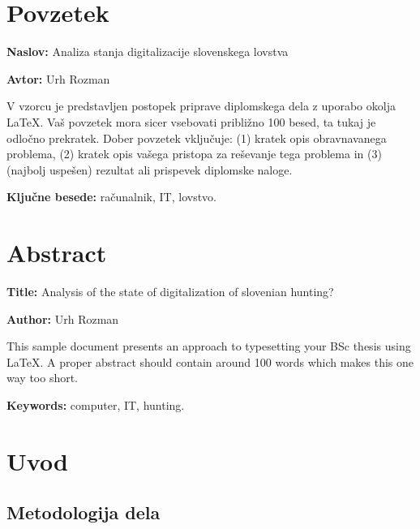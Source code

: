 \documentclass[a4paper,12pt,openright]{book}
\newcommand{\ttitle}{Analiza stanja digitalizacije slovenskega lovstva}
\newcommand{\ttitleEn}{Analysis of the state of digitalization of slovenian hunting?}
\newcommand{\tauthor}{Urh Rozman}
\newcommand{\tkeywords}{računalnik, IT, lovstvo}
\newcommand{\tkeywordsEn}{computer, IT, hunting}
\newcommand{\clearemptydoublepage}{\newpage{\pagestyle{empty}\cleardoublepage}}
\begin{document}
\clearemptydoublepage

\chapter*{Povzetek}

\noindent\textbf{Naslov:} \ttitle
\bigskip

\noindent\textbf{Avtor:} \tauthor
\bigskip

\noindent V vzorcu je predstavljen postopek priprave diplomskega dela z uporabo okolja \LaTeX. Vaš povzetek mora sicer vsebovati približno 100 besed, ta tukaj je odločno prekratek.
Dober povzetek vključuje: (1) kratek opis obravnavanega problema, (2) kratek opis vašega pristopa za reševanje tega problema in (3) (najbolj uspešen) rezultat ali prispevek diplomske naloge.

\bigskip

\noindent\textbf{Ključne besede:} \tkeywords.
\clearemptydoublepage

\chapter*{Abstract}

\noindent\textbf{Title:} \ttitleEn
\bigskip

\noindent\textbf{Author:} \tauthor
\bigskip

\noindent This sample document presents an approach to typesetting your BSc thesis using \LaTeX. 
A proper abstract should contain around 100 words which makes this one way too short.
\bigskip

\noindent\textbf{Keywords:} \tkeywordsEn.
\clearemptydoublepage

\mainmatter
\setcounter{page}{1}
\pagestyle{fancy}

\chapter{Uvod}
\label{start}

\section{Metodologija dela}
\end{document}
